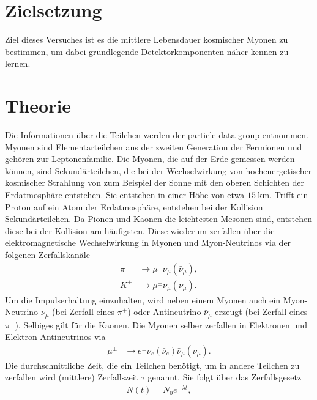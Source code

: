 \section{Zielsetzung}\label{sec:Zielsetzung}

Ziel dieses Versuches ist es die mittlere Lebensdauer kosmischer Myonen zu bestimmen, um dabei grundlegende Detektorkomponenten näher kennen zu lernen.

\section{Theorie}\label{sec:Theorie}

Die Informationen über die Teilchen werden der particle data group entnommen\cite{ParticleDataGroup:2024cfk}. \newline
Myonen sind Elementarteilchen aus der zweiten Generation der Fermionen und gehören zur Leptonenfamilie.
Die Myonen, die auf der Erde gemessen werden können, sind Sekundärteilchen, die bei der Wechselwirkung von hochenergetischer kosmischer Strahlung von zum Beispiel der Sonne mit den oberen Schichten der Erdatmosphäre entstehen.
Sie entstehen in einer Höhe von etwa $\SI{15}{\kilo\meter}$.
Trifft ein Proton auf ein Atom der Erdatmosphäre, entstehen bei der Kollision Sekundärteilchen.
Da Pionen und Kaonen die leichtesten Mesonen sind, entstehen diese bei der Kollision am häufigsten.
Diese wiederum zerfallen über die elektromagnetische Wechselwirkung in Myonen und Myon-Neutrinos via der folgenen Zerfallskanäle
\begin{align*}
    \pi^\pm&\rightarrow \mu^\pm\nu_\mu(\bar\nu_\mu),\\
    K^\pm&\rightarrow\mu^\pm\nu_\mu(\bar\nu_\mu).
\end{align*}
Um die Impulserhaltung einzuhalten, wird neben einem Myonen auch ein Myon-Neutrino $\nu_\mu$ (bei Zerfall eines $\pi^+$) oder Antineutrino $\bar\nu_\mu$ erzeugt (bei Zerfall eines $\pi^-$).
Selbiges gilt für die Kaonen. 
Die Myonen selber zerfallen in Elektronen und Elektron-Antineutrinos via
\begin{align*}
    \mu^\pm &\rightarrow e^\pm \nu_e(\bar\nu_e) \bar\nu_\mu (\nu_\mu).
\end{align*}
\newline
Die durchschnittliche Zeit, die ein Teilchen benötigt, um in andere Teilchen zu zerfallen wird (mittlere) Zerfallszeit $\tau$ genannt.
Sie folgt über das Zerfallsgesetz 
\begin{align}
    N(t)=N_0e^{-\lambda t},
\end{align}
